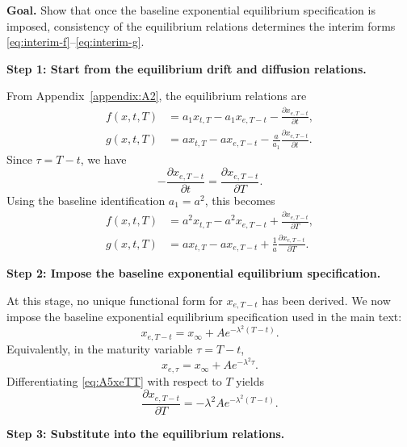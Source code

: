 \documentclass[12pt]{article}
\theoremstyle{statementstyle}
\begin{document}
\begin{appendices}
\textbf{Goal.}
Show that once the baseline exponential equilibrium specification is
imposed, consistency of the equilibrium relations determines the interim
forms \eqref{eq:interim-f}--\eqref{eq:interim-g}.

\medskip
\noindent\textbf{Step 1: Start from the equilibrium drift and diffusion relations.}

From Appendix~\ref{appendix:A2}, the equilibrium relations are
\begin{align}
f(x,t,T)
&=
a_1 x_{t,T}
-
a_1 x_{e,T-t}
-
\frac{\partial x_{e,T-t}}{\partial t},
\tag{A.5.1a}\label{eq:A5eqdrift}
\\[0.4em]
g(x,t,T)
&=
a x_{t,T}
-
a x_{e,T-t}
-
\frac{a}{a_1}\frac{\partial x_{e,T-t}}{\partial t}.
\tag{A.5.1b}\label{eq:A5eqdiff}
\end{align}
Since \(\tau=T-t\), we have
\[
-\frac{\partial x_{e,T-t}}{\partial t}
=
\frac{\partial x_{e,T-t}}{\partial T}.
\]
Using the baseline identification \(a_1=a^2\), this becomes
\begin{align}
f(x,t,T)
&=
a^{2}x_{t,T}
-
a^{2}x_{e,T-t}
+
\frac{\partial x_{e,T-t}}{\partial T},
\tag{A.5.2a}\label{eq:A5fpre}
\\[0.4em]
g(x,t,T)
&=
a x_{t,T}
-
a x_{e,T-t}
+
\frac{1}{a}\frac{\partial x_{e,T-t}}{\partial T}.
\tag{A.5.2b}\label{eq:A5gpre}
\end{align}

\medskip
\noindent\textbf{Step 2: Impose the baseline exponential equilibrium specification.}

At this stage, no unique functional form for \(x_{e,T-t}\) has been
derived. We now impose the baseline exponential equilibrium specification
used in the main text:
\begin{equation}
x_{e,T-t}
=
x_{\infty}+A e^{-\lambda^{2}(T-t)}.
\tag{A.5.3}\label{eq:A5xeTT}
\end{equation}
Equivalently, in the maturity variable \(\tau=T-t\),
\begin{equation}
x_{e,\tau}=x_{\infty}+A e^{-\lambda^{2}\tau}.
\tag{A.5.4}\label{eq:A5xe}
\end{equation}
Differentiating \eqref{eq:A5xeTT} with respect to \(T\) yields
\begin{equation}
\frac{\partial x_{e,T-t}}{\partial T}
=
-\lambda^{2}A e^{-\lambda^{2}(T-t)}.
\tag{A.5.5}\label{eq:A5xediff}
\end{equation}

\medskip
\noindent\textbf{Step 3: Substitute into the equilibrium relations.}


\end{appendices}
\end{document}

